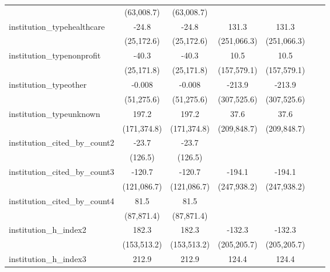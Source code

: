 \begin{tabular}{lcccccc}
                                      & (63,008.7)   & (63,008.7)   &             &             &     &   \\   
   institution\_typehealthcare        & -24.8        & -24.8        & 131.3       & 131.3       &     &   \\   
                                      & (25,172.6)   & (25,172.6)   & (251,066.3) & (251,066.3) &     &   \\   
   institution\_typenonprofit         & -40.3        & -40.3        & 10.5        & 10.5        &     &   \\   
                                      & (25,171.8)   & (25,171.8)   & (157,579.1) & (157,579.1) &     &   \\   
   institution\_typeother             & -0.008       & -0.008       & -213.9      & -213.9      &     &   \\   
                                      & (51,275.6)   & (51,275.6)   & (307,525.6) & (307,525.6) &     &   \\   
   institution\_typeunknown           & 197.2        & 197.2        & 37.6        & 37.6        &     &   \\   
                                      & (171,374.8)  & (171,374.8)  & (209,848.7) & (209,848.7) &     &   \\   
   institution\_cited\_by\_count2     & -23.7        & -23.7        &             &             &     &   \\   
                                      & (126.5)      & (126.5)      &             &             &     &   \\   
   institution\_cited\_by\_count3     & -120.7       & -120.7       & -194.1      & -194.1      &     &   \\   
                                      & (121,086.7)  & (121,086.7)  & (247,938.2) & (247,938.2) &     &   \\   
   institution\_cited\_by\_count4     & 81.5         & 81.5         &             &             &     &   \\   
                                      & (87,871.4)   & (87,871.4)   &             &             &     &   \\   
   institution\_h\_index2             & 182.3        & 182.3        & -132.3      & -132.3      &     &   \\   
                                      & (153,513.2)  & (153,513.2)  & (205,205.7) & (205,205.7) &     &   \\   
   institution\_h\_index3             & 212.9        & 212.9        & 124.4       & 124.4       &     &   \\   

\end{tabular}
